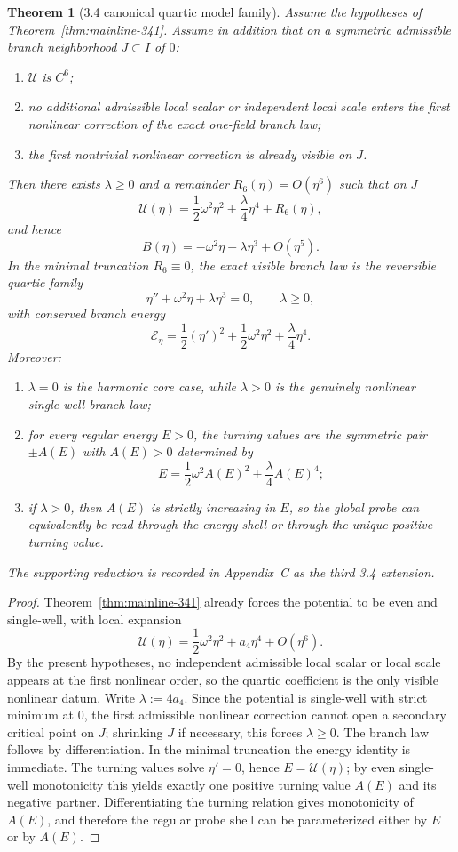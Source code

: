 \documentclass[12pt,a4paper]{article}
\newtheorem{theorem}{Theorem}[section]
\begin{document}
\begin{theorem}[3.4 canonical quartic model family]
\label{thm:mainline-342}
Assume the hypotheses of Theorem~\ref{thm:mainline-341}. Assume in addition that on a symmetric admissible branch neighborhood $J\subset I$ of $0$:
\begin{enumerate}[label=(\alph*)]
 \item $\mathcal U$ is $C^6$;
 \item no additional admissible local scalar or independent local scale enters the first nonlinear correction of the exact one-field branch law;
 \item the first nontrivial nonlinear correction is already visible on $J$.
\end{enumerate}
Then there exists $\lambda\ge 0$ and a remainder $R_6(\eta)=O(\eta^6)$ such that on $J$
\[
 \mathcal U(\eta)=\frac12\omega^2\eta^2+\frac{\lambda}{4}\eta^4+R_6(\eta),
\]
and hence
\[
 B(\eta)=-\omega^2\eta-\lambda\eta^3+O(\eta^5).
\]
In the minimal truncation $R_6\equiv 0$, the exact visible branch law is the reversible quartic family
\[
 \eta''+\omega^2\eta+\lambda\eta^3=0,
 \qquad \lambda\ge 0,
\]
with conserved branch energy
\[
 \mathcal E_\eta = \frac12(\eta')^2+\frac12\omega^2\eta^2+\frac{\lambda}{4}\eta^4.
\]
Moreover:
\begin{enumerate}[label=(\roman*)]
 \item $\lambda=0$ is the harmonic core case, while $\lambda>0$ is the genuinely nonlinear single-well branch law;
 \item for every regular energy $E>0$, the turning values are the symmetric pair $\pm A(E)$ with $A(E)>0$ determined by
 \[
 E=\frac12\omega^2A(E)^2+\frac{\lambda}{4}A(E)^4;
 \]
 \item if $\lambda>0$, then $A(E)$ is strictly increasing in $E$, so the global probe can equivalently be read through the energy shell or through the unique positive turning value.
\end{enumerate}
The supporting reduction is recorded in Appendix~C as the third 3.4 extension.
\end{theorem}

\begin{proof}
Theorem~\ref{thm:mainline-341} already forces the potential to be even and single-well, with local expansion
\[
 \mathcal U(\eta)=\frac12\omega^2\eta^2+a_4\eta^4+O(\eta^6).
\]
By the present hypotheses, no independent admissible local scalar or local scale appears at the first nonlinear order, so the quartic coefficient is the only visible nonlinear datum. Write $\lambda:=4a_4$. Since the potential is single-well with strict minimum at $0$, the first admissible nonlinear correction cannot open a secondary critical point on $J$; shrinking $J$ if necessary, this forces $\lambda\ge 0$. The branch law follows by differentiation. In the minimal truncation the energy identity is immediate. The turning values solve $\eta'=0$, hence $E=\mathcal U(\eta)$; by even single-well monotonicity this yields exactly one positive turning value $A(E)$ and its negative partner. Differentiating the turning relation gives monotonicity of $A(E)$, and therefore the regular probe shell can be parameterized either by $E$ or by $A(E)$.
\end{proof}
\end{document}
